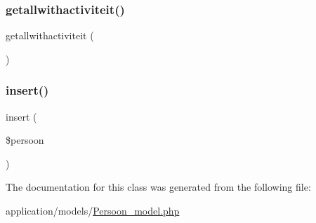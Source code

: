 \mbox{\label{class_persoon__model_a20a10592218dbf11fd43c955ce5fcee1}} 
\subsubsection{\texorpdfstring{getallwithactiviteit()}{getallwithactiviteit()}}
{\footnotesize\ttfamily getallwithactiviteit (\begin{DoxyParamCaption}{ }\end{DoxyParamCaption})}

\mbox{\label{class_persoon__model_abb16337bee193e227f25cb9e37ac9394}} 
\subsubsection{\texorpdfstring{insert()}{insert()}}
{\footnotesize\ttfamily insert (\begin{DoxyParamCaption}\item[{}]{\$persoon }\end{DoxyParamCaption})}



The documentation for this class was generated from the following file\+:\begin{DoxyCompactItemize}
\item 
application/models/\mbox{\hyperlink{_persoon__model_8php}{Persoon\+\_\+model.\+php}}\end{DoxyCompactItemize}
